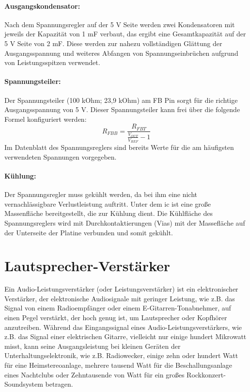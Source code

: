 \paragraph{Ausgangskondensator:}
Nach dem Spannungsregler auf der 5 V Seite werden zwei Kondensatoren mit jeweils der Kapazität von 1 mF verbaut, das ergibt eine Gesamtkapazität auf der 5 V Seite von 2 mF.
Diese werden zur nahezu vollständigen Glättung der Ausgangsspannung und weiteres Abfangen von Spannungseinbrüchen aufgrund von Leistungsspitzen verwendet.

\paragraph{Spannungsteiler:}
Der Spannungsteiler (100 kOhm; 23,9 kOhm) am FB Pin sorgt für die richtige Ausgangsspannung von 5 V.
Dieser Spannungsteiler kann frei über die folgende Formel konfiguriert werden:
\[R_{FBB}=\frac{R_{FBT}}{\frac{V_{OUT}}{V_{REF}}-1}\]
Im Datenblatt des Spannungsreglers sind bereits Werte für die am häufigsten verwendeten Spannungen vorgegeben.

\paragraph{Kühlung:}
Der Spannungsregler muss gekühlt werden, da bei ihm eine nicht vernachlässigbare Verlustleistung auftritt.
Unter dem \ac{ic} ist eine große Massenfläche bereitgestellt, die zur Kühlung dient.
Die Kühlfläche des Spannungsreglers wird mit Durchkontaktierungen (Vias) mit der Massefläche auf der Unterseite der Platine verbunden und somit gekühlt.

\section{Lautsprecher-Verstärker}
Ein Audio-Leistungsverstärker (oder Leistungsverstärker) ist ein elektronischer Verstärker, der elektronische Audiosignale mit geringer Leistung, wie z.B. das Signal von einem Radioempfänger oder einem E-Gitarren-Tonabnehmer, auf einen Pegel verstärkt, der hoch genug ist, um Lautsprecher oder Kopfhörer anzutreiben.
Während das Eingangssignal eines Audio-Leistungsverstärkers, wie z.B. das Signal einer elektrischen Gitarre, vielleicht nur einige hundert Mikrowatt misst, kann seine Ausgangsleistung bei kleinen Geräten der Unterhaltungselektronik, wie z.B. Radiowecker, einige zehn oder hundert Watt für eine Heimstereoanlage, mehrere tausend Watt für die Beschallungsanlage eines Nachtclubs oder Zehntausende von Watt für ein großes Rockkonzert-Soundsystem betragen. \cite[vgl.][]{electronicshub-pwm-amp}

